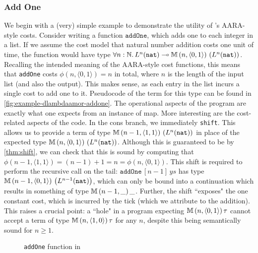 \subsubsection{Add One}
We begin with a (very) simple example to demonstrate the utility of \dlambdaamor's AARA-style costs. Consider writing a function $\texttt{addOne}$, which adds one to each integer in a list. If we assume the cost model that natural number addition costs one unit of time, the function would have type $\forall n : \mathbb{N}. \, L^n(\texttt{nat}) \multimap \mathbb{M} \, (n,\langle 0,1 \rangle) \, \left(L^n(\texttt{nat})\right)$. Recalling the intended meaning of the AARA-style cost functions, this means that \texttt{addOne} costs $\phi(n,\langle 0,1 \rangle) = n$ in total, where $n$ is the length of the input list (and also the output). This makes sense, as each entry in the list incurs a single cost to add one to it. Pseudocode of the term for this type can be found in \autoref{fig:example-dlambdaamor-addone}. The operational aspects of the program are exactly what one expects from an instance of map. More interesting are the cost-related aspects of the code. In the cons branch, we immediately \texttt{shift}. This allows us to provide a term of type  $\mathbb{M} \, (n-1,\langle 1,1 \rangle) \, \left(L^n(\texttt{nat})\right)$ in place of the expected type $\mathbb{M} \, (n,\langle 0,1 \rangle) \, \left(L^n(\texttt{nat})\right)$. Although this is guaranteed to be by \autoref{thm:shift}, we can check that this is sound by computing that $\phi(n-1,\langle 1,1 \rangle) = (n-1) + 1 = n = \phi(n,\langle 0,1 \rangle)$. This shift is required to perform the recursive call on the tail: $\texttt{addOne} \, [n-1] \, ys$ has type $\mathbb{M} \, (n-1,\langle 0,1 \rangle) \, \left(L^{n-1} (\texttt{nat})\right)$, which can only be bound into a continuation which results in something of type $\mathbb{M} \, (n-1, \_) \, \_$. Further, the shift ``exposes" the one constant cost, which is incurred by the tick (which we attribute to the addition). This raises a crucial point: a ``hole" in a program expecting $\mathbb{M} \, (n,\langle 0,1 \rangle) \, \tau$ cannot accept a term of type $\mathbb{M} \, (n, \langle 1,0 \rangle) \, \tau$ for any $n$, despite this being semantically sound for $n \geq 1$.

\begin{figure}

\caption{\texttt{addOne} function in \dlambdaamor}
\label{fig:example-dlambdaamor-addone}
\end{figure}


